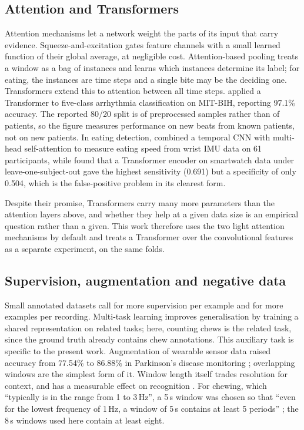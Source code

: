 \subsection{Attention and Transformers}

Attention mechanisms let a network weight the parts of its input that carry
evidence. Squeeze-and-excitation \citep{hu2018squeeze} gates feature channels
with a small learned function of their global average, at negligible cost.
Attention-based pooling \citep{ilse2018attention} treats a window as a bag
of instances and learns which instances determine its label; for eating,
the instances are time steps and a single bite may be the deciding one.
Transformers extend this to attention between all time steps.
\citet{ikram2025transformer} applied a Transformer to five-class arrhythmia
classification on MIT-BIH, reporting 97.1\% accuracy. The reported 80/20
split is of preprocessed samples rather than of patients, so the figure
measures performance on new beats from known patients, not on new
patients. In eating detection, \citet{wang2024eating} combined a temporal
CNN with multi-head self-attention to measure eating speed from wrist IMU
data on 61 participants, while \citet{vedovelli2026recognition} found that a
Transformer encoder on smartwatch data under leave-one-subject-out gave the
highest sensitivity (0.691) but a specificity of only 0.504, which is the
false-positive problem in its clearest form.

Despite their promise, Transformers carry many more parameters than the
attention layers above, and whether they help at a given data size is an
empirical question rather than a given. This work therefore uses the two
light attention mechanisms by default and treats a Transformer over the
convolutional features as a separate experiment, on the same folds.

\subsection{Supervision, augmentation and negative data}

Small annotated datasets call for more supervision per example and for more
examples per recording. Multi-task learning \citep{caruana1997multitask}
improves generalisation by training a shared representation on related
tasks; here, counting chews is the related task, since the ground truth
already contains chew annotations. This auxiliary task is specific to the
present work. Augmentation of wearable sensor data
raised accuracy from 77.54\% to 86.88\% in Parkinson's disease monitoring
\citep{um2017augmentation}; overlapping windows are the simplest form of it.
Window length itself trades resolution for context, and has a measurable
effect on recognition \citep{banos2014window}. For chewing, which ``typically
is in the range from 1 to 3\,Hz'', a 5\,s window was chosen so that ``even for
the lowest frequency of 1\,Hz, a window of 5\,s contains at least 5 periods''
\citep{diou2022intake}; the 8\,s windows used here contain at least eight.

